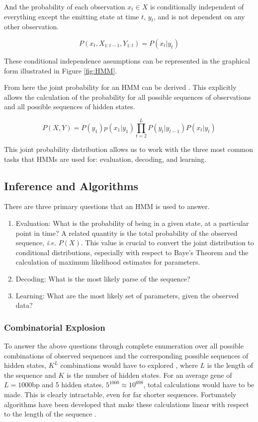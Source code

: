 And the probability of each observation $x_t \in X$ is conditionally independent of everything except the emitting state at time $t$, $y_t$, and is not dependent on any other observation.

\begin{equation}
    P(x_t,X_{1:t-1},Y_{1:t}) = P(x_t|y_t)
\end{equation}

These conditional independence assumptions can be represented in the graphical form illustrated in Figure \ref{fig:HMM}. 

From here the joint probability for an HMM can be derived \cite{Rabiner1989ARecognition}. This explicitly allows the calculation of the probability for all possible sequences of observations and all possible sequences of hidden states. 

\begin{equation}
    P(X,Y) = P(y_1)p(x_1|y_1)\prod_{t=2}^L{P(y_t|y_{t-1})P(x_t|y_t)}
\label{eq:jointhmm}
\end{equation}

This joint probability distribution allows us to work with the three most common tasks that HMMs are used for: evaluation, decoding, and learning.
\subsection{Inference and Algorithms}
There are three primary questions that an HMM is used to answer. 

\begin{enumerate}
    \item Evaluation: What is the probability of being in a given state, at a particular point in time? A related quantity is the total probability of the observed sequence, \emph{i.e.} $P(X)$. This value is crucial to convert the joint distribution to conditional distributions, especially with respect to Baye's Theorem and the calculation of maximum likelihood estimates for parameters.
    \item Decoding: What is the most likely parse of the sequence? 
    \item Learning: What are the most likely set of parameters, given the observed data?
\end{enumerate}

\subsubsection{Combinatorial Explosion}
To answer the above questions through complete enumeration over all possible combinations of observed sequences and the corresponding possible sequences of hidden states, $K^L$ combinations would have to explored \cite{Rabiner1989ARecognition}, where $L$ is the length of the sequence and $K$ is the number of hidden states. For an average gene of $L=1000$bp and 5 hidden states, $5^{1000}\approx10^{698}$, total calculations would have to be made. This is clearly intractable, even for far shorter sequences. Fortunately algorithms have been developed that make these calculations linear with respect to the length of the sequence \cite{Rabiner1989ARecognition}. 

